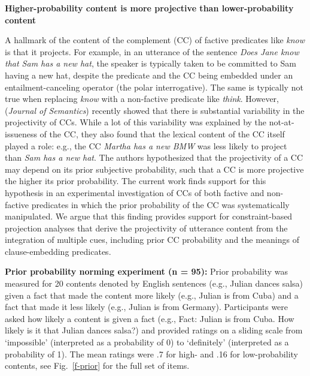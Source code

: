 \documentclass[12pt,fleqn]{article}
\newcommand{\6}{\mbox{$[\hspace*{-.6mm}[$}}
\newcommand{\9}{\mbox{$]\hspace*{-.6mm}]$}}
\begin{document}
  
\begin{center}
{\bf Higher-probability content is more projective than lower-probability content}
\end{center}

\vspace*{-.3cm}

\noindent
A hallmark of the content of the complement (CC) of factive predicates like {\em know}  is that it projects. For example, in an utterance of the sentence \emph{Does Jane know that Sam has a new hat}, the speaker is typically taken to be committed to Sam having a new hat, despite the predicate and the CC being embedded under an entailment-canceling operator (the polar interrogative). The same is typically not true when replacing \emph{know} with a non-factive predicate like \emph{think}. However,  \citealt*{tbd-variability} ({\em Journal of Semantics})  recently showed that there is substantial variability in the projectivity of CCs. While a lot of this variability was explained by the not-at-issueness of the CC, they also found that the lexical content of the CC itself played a role: e.g., the CC \emph{Martha has a new BMW} was less likely to project than \emph{Sam has a new hat}. The authors hypothesized that the projectivity of a CC may depend on its prior subjective probability, such that a CC is more projective the higher its prior probability. The current work finds support for this hypothesis in an experimental investigation of CCs of both factive and non-factive predicates in which the prior probability of the CC was systematically manipulated. We argue that this finding provides support for constraint-based projection analyses that derive the projectivity of utterance content from the integration of multiple cues, including prior CC probability and the meanings of clause-embedding predicates.


\noindent
{\bf Prior probability norming experiment (n = 95):} Prior probability was measured for 20 contents denoted by English sentences (e.g., Julian dances salsa) given a fact that made the content more likely (e.g., Julian is from Cuba) and a fact that made it less likely (e.g., Julian is from Germany). Participants were asked how likely a content is given a fact (e.g., Fact: Julian is from Cuba. How likely is it that Julian dances salsa?) and provided ratings on a sliding scale from `impossible' (interpreted as a probability of 0) to `definitely' (interpreted as a probability of 1). The mean ratings were .7 for high- and .16 for low-probability contents, see Fig.~\ref{f-prior} for the full set of items.
\end{document}
